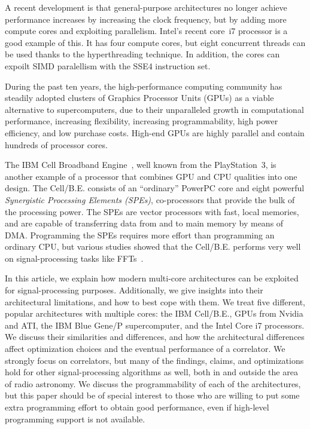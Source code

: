 \documentclass{article}
\begin{document}
A recent development is that general-purpose architectures no longer
achieve performance increases by increasing the clock frequency, but
by adding more compute cores and exploiting parallelism.  Intel's
recent core~i7 processor is a good example of this. It has four
compute cores, but eight concurrent threads can be used thanks to the
hyperthreading technique. In addition, the cores can expoilt SIMD
paralellism with the SSE4 instruction set.

During the past ten years, the high-performance computing community has
steadily adopted clusters of Graphics Processor Units (GPUs) as a viable
alternative to supercomputers, due to their unparalleled growth in
computational performance, increasing flexibility, increasing programmability,
high power efficiency, and low purchase costs.
High-end GPUs are highly parallel and contain hundreds of processor cores.

The IBM Cell Broadband Engine~\cite{Gschwind:06}, well known from the
PlayStation~3, is another example of a processor that combines GPU and CPU
qualities into one design.
The Cell/B.E. consists of an ``ordinary'' PowerPC core and eight powerful
\emph{Synergistic Processing Elements (SPEs)}, co-processors that provide
the bulk of the processing power.
The SPEs are vector processors with fast, local memories, and are capable
of transferring data from and to main memory by means of DMA.
Programming the SPEs requires more effort than programming an ordinary CPU,
but various studies showed that the Cell/B.E. performs very well on
signal-processing tasks like FFTs~\cite{fftc}.

In this article, we explain how modern multi-core architectures can be
exploited for signal-processing purposes.  Additionally, we give
insights into their architectural limitations, and how to best cope
with them.  We treat five different, popular architectures with
multiple cores: the IBM Cell/B.E., GPUs from Nvidia and ATI, the IBM
Blue Gene/P supercomputer, and the Intel Core i7 processors.  We discuss their
similarities and differences, and how the architectural differences
affect optimization choices and the eventual performance of a
correlator.  We strongly focus on correlators, but many of the
findings, claims, and optimizations hold for other signal-processing
algorithms as well, both in and outside the area of radio astronomy.
We discuss the programmability of each of the architectures, but this
paper should be of special interest to those who are willing to put
some extra programming effort to obtain good performance, even if
high-level programming support is not available.
\end{document}
